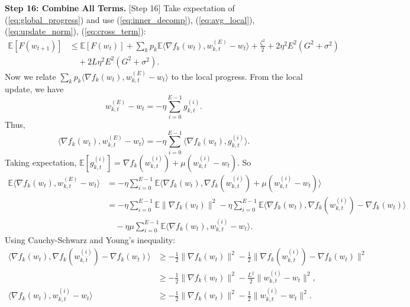 \documentclass{article}
\begin{document}
\textbf{Step 16: Combine All Terms.} [Step 16] %
Take expectation of (\ref{eq:global_progress}) and use (\ref{eq:inner_decomp}), (\ref{eq:avg_local}), (\ref{eq:update_norm}), (\ref{eq:cross_term}):
\begin{align}
    \mathbb{E}[F(w_{t+1})] &\leq \mathbb{E}[F(w_t)] + \sum_k p_k \mathbb{E} \langle \nabla f_k(w_t), w_{k,t}^{(E)} - w_t \rangle + \frac{\zeta^2}{2} + 2 \eta^2 E^2 (G^2 + \sigma^2) \\
    &\quad + 2 L \eta^2 E^2 (G^2 + \sigma^2).
\end{align}
Now we relate $\sum_k p_k \langle \nabla f_k(w_t), w_{k,t}^{(E)} - w_t \rangle$ to the local progress. From the local update, we have
\begin{equation}
    w_{k,t}^{(E)} - w_t = - \eta \sum_{i=0}^{E-1} g_{k,t}^{(i)}.
\end{equation}
Thus,
\begin{equation}
    \langle \nabla f_k(w_t), w_{k,t}^{(E)} - w_t \rangle = - \eta \sum_{i=0}^{E-1} \langle \nabla f_k(w_t), g_{k,t}^{(i)} \rangle.
\end{equation}
Taking expectation, $\mathbb{E}[g_{k,t}^{(i)}] = \nabla f_k(w_{k,t}^{(i)}) + \mu (w_{k,t}^{(i)} - w_t)$. So
\begin{align}
    \mathbb{E} \langle \nabla f_k(w_t), w_{k,t}^{(E)} - w_t \rangle &= - \eta \sum_{i=0}^{E-1} \mathbb{E} \langle \nabla f_k(w_t), \nabla f_k(w_{k,t}^{(i)}) + \mu (w_{k,t}^{(i)} - w_t) \rangle \\
    &= - \eta \sum_{i=0}^{E-1} \mathbb{E} \| \nabla f_k(w_t) \|^2 - \eta \sum_{i=0}^{E-1} \mathbb{E} \langle \nabla f_k(w_t), \nabla f_k(w_{k,t}^{(i)}) - \nabla f_k(w_t) \rangle \\
    &\quad - \eta \mu \sum_{i=0}^{E-1} \mathbb{E} \langle \nabla f_k(w_t), w_{k,t}^{(i)} - w_t \rangle.
\end{align}
Using Cauchy-Schwarz and Young's inequality:
\begin{align}
    \langle \nabla f_k(w_t), \nabla f_k(w_{k,t}^{(i)}) - \nabla f_k(w_t) \rangle &\geq -\frac{1}{2} \| \nabla f_k(w_t) \|^2 - \frac{1}{2} \| \nabla f_k(w_{k,t}^{(i)}) - \nabla f_k(w_t) \|^2 \\
    &\geq -\frac{1}{2} \| \nabla f_k(w_t) \|^2 - \frac{L^2}{2} \| w_{k,t}^{(i)} - w_t \|^2, \\
    \langle \nabla f_k(w_t), w_{k,t}^{(i)} - w_t \rangle &\geq -\frac{1}{2} \| \nabla f_k(w_t) \|^2 - \frac{1}{2} \| w_{k,t}^{(i)} - w_t \|^2.
\end{align}
\end{document}
